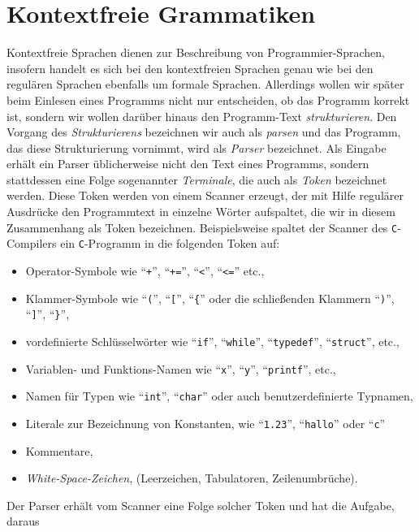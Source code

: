 \section{Kontextfreie Grammatiken \label{kontextfreie}}
Kontextfreie Sprachen dienen zur Beschreibung von Programmier-Sprachen, insofern handelt
es sich bei den kontextfreien Sprachen genau wie bei den regul\"aren Sprachen ebenfalls um
formale Sprachen.  Allerdings wollen wir sp\"ater beim Einlesen eines Programms nicht nur
entscheiden, ob das Programm korrekt ist, sondern wir wollen dar\"uber hinaus den
Programm-Text \emph{strukturieren}.  Den Vorgang des \emph{Strukturierens} bezeichnen wir
auch als \emph{parsen} und das Programm, das diese Strukturierung vornimmt, wird als
\emph{Parser} bezeichnet.  Als Eingabe erh\"alt ein Parser \"ublicherweise nicht den
Text eines Programms, sondern stattdessen eine Folge sogenannter \emph{Terminale}, die auch
als \emph{Token} bezeichnet werden.  Diese 
Token werden von einem Scanner erzeugt, der mit Hilfe regul\"arer Ausdr\"ucke den Programmtext
in einzelne W\"orter aufspaltet, die wir in diesem Zusammenhang als Token bezeichnen.
Beispielsweise spaltet der Scanner des \texttt{C}-Compilers ein \texttt{C}-Programm in die
folgenden Token auf:
\begin{itemize}
\item Operator-Symbole wie ``\texttt{+}'', ``\texttt{+=}'', ``\texttt{<}'',
      ``\texttt{<=}'' etc.,
\item Klammer-Symbole wie ``\texttt{(}'', ``\texttt{[}'', ``\texttt{\{}''  oder
      die schlie{\ss}enden Klammern ``\texttt{)}'', ``\texttt{]}'', ``\texttt{\}}'',
\item vordefinierte Schl\"usselw\"orter wie ``\texttt{if}'', ``\texttt{while}'',
      ``\texttt{typedef}'', ``\texttt{struct}'', etc.,
\item Variablen- und Funktions-Namen wie ``\texttt{x}'', ``\texttt{y}'',
      ``\texttt{printf}'', etc.,
\item Namen f\"ur Typen wie ``\texttt{int}'', ``\texttt{char}'' oder auch benutzerdefinierte
      Typnamen,
\item Literale zur Bezeichnung von Konstanten, wie ``\texttt{1.23}'', 
      ``\texttt{hallo}'' oder ``\texttt{c}''
\item Kommentare,
\item \emph{White-Space-Zeichen}, (Leerzeichen, Tabulatoren, Zeilenumbr\"uche).
\end{itemize}
Der Parser erh\"alt vom Scanner eine Folge solcher Token und hat die Aufgabe, daraus
